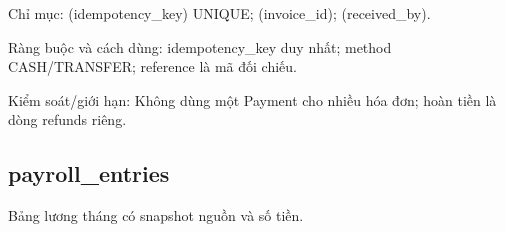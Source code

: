 Chỉ mục:\allowbreak{} (idempotency\_\allowbreak{}key) UNIQUE; (invoice\_\allowbreak{}id); (received\_\allowbreak{}by).\allowbreak{}

Ràng buộc và cách dùng:\allowbreak{} idempotency\_\allowbreak{}key duy nhất; method CASH/\allowbreak{}TRANSFER; reference là mã đối chiếu.\allowbreak{}

Kiểm soát/\allowbreak{}giới hạn:\allowbreak{} Không dùng một Payment cho nhiều hóa đơn; hoàn tiền là dòng refunds riêng.\allowbreak{}

\clearpage

\subsection{payroll\_\allowbreak{}entries}
Bảng lương tháng có snapshot nguồn và số tiền.\allowbreak{}


